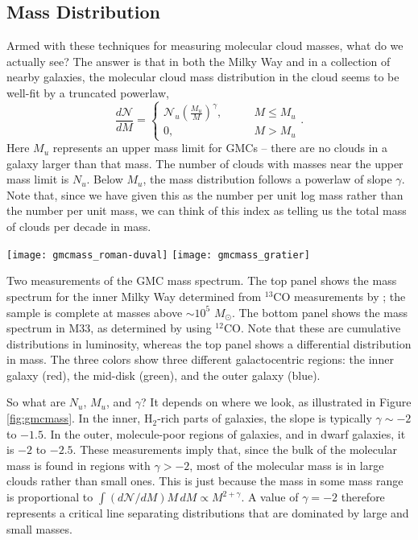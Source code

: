 \subsection{Mass Distribution}

Armed with these techniques for measuring molecular cloud masses, what do we actually see? The answer is that in both the Milky Way and in a collection of nearby galaxies, the molecular cloud mass distribution in the cloud seems to be well-fit by a truncated powerlaw,
\begin{equation}
\frac{d\mathcal{N}}{d M} =
\left\{
\begin{array}{ll}
\mathcal{N}_u \left(\frac{M_u}{M}\right)^{\gamma}, \qquad & M \leq M_u \\
0, & M > M_u
\end{array}
\right..
\end{equation}
Here $M_u$ represents an upper mass limit for GMCs -- there are no clouds in a galaxy larger than that mass. The number of clouds with masses near the upper mass limit is $N_u$. Below $M_u$, the mass distribution follows a powerlaw of slope $\gamma$. Note that, since we have given this as the number per unit log mass rather than the number per unit mass, we can think of this index as telling us the total mass of clouds per decade in mass.

\begin{marginfigure}
\texttt{[image: gmcmass\_roman-duval]}
\texttt{[image: gmcmass\_gratier]}
\caption[GMC mass spectra]{
\label{fig:gmcmass}
Two measurements of the GMC mass spectrum. The top panel shows the mass spectrum for the inner Milky Way determined from $^{13}$CO measurements by \citet{roman-duval10a}; the sample is complete at masses above $\sim 10^5$ $M_\odot$. The bottom panel shows the mass spectrum in M33, as determined by \citet{gratier12a} using $^{12}$CO. Note that these are cumulative distributions in luminosity, whereas the top panel shows a differential distribution in mass. The three colors show three different galactocentric regions: the inner galaxy (red), the mid-disk (green), and the outer galaxy (blue).
}
\end{marginfigure}

So what are $N_u$, $M_u$, and $\gamma$? It depends on where we look, as illustrated in Figure \ref{fig:gmcmass}. In the inner, H$_2$-rich parts of galaxies, the slope is typically $\gamma \sim -2$ to $-1.5$. In the outer, molecule-poor regions of galaxies, and in dwarf galaxies, it is $-2$ to $-2.5$. These measurements imply that, since the bulk of the molecular mass is found in regions with $\gamma > -2$, most of the molecular mass is in large clouds rather than small ones. This is just because the mass in some mass range is proportional to $\int (d\mathcal{N}/dM) M \, dM \propto M^{2+\gamma}$. A value of $\gamma=-2$ therefore represents a critical line separating distributions that are dominated by large and small masses.

